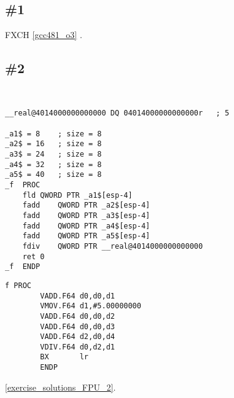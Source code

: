 \section{\Exercises}

\subsection{\Exercise \#1}

 FXCH  
\ref{gcc481_o3} .

\subsection{\Exercise \#2}
\label{exercise_FPU_2}

\WhatThisCodeDoes\

\begin{lstlisting}[caption=\Optimizing MSVC 2010]
__real@4014000000000000 DQ 04014000000000000r	; 5

_a1$ = 8	; size = 8
_a2$ = 16	; size = 8
_a3$ = 24	; size = 8
_a4$ = 32	; size = 8
_a5$ = 40	; size = 8
_f	PROC
	fld	QWORD PTR _a1$[esp-4]
	fadd	QWORD PTR _a2$[esp-4]
	fadd	QWORD PTR _a3$[esp-4]
	fadd	QWORD PTR _a4$[esp-4]
	fadd	QWORD PTR _a5$[esp-4]
	fdiv	QWORD PTR __real@4014000000000000
	ret	0
_f	ENDP
\end{lstlisting}

\begin{lstlisting}[caption=\NonOptimizingKeilVI (\ThumbMode{} / \RU{скомпилировано для}\EN{compiled for} Cortex-R4F CPU)]
f PROC
        VADD.F64 d0,d0,d1
        VMOV.F64 d1,#5.00000000
        VADD.F64 d0,d0,d2
        VADD.F64 d0,d0,d3
        VADD.F64 d2,d0,d4
        VDIV.F64 d0,d2,d1
        BX       lr
        ENDP
\end{lstlisting}

\Answer\: \ref{exercise_solutions_FPU_2}.

